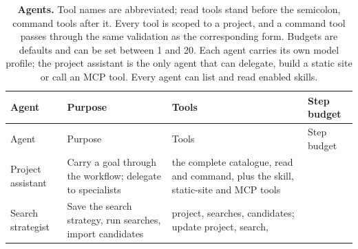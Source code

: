 \documentclass[11pt,a4paper]{article}
\begin{document}
\begin{longtable}[]{@{}
  >{\raggedright\arraybackslash}p{}
  >{\raggedright\arraybackslash}p{}
  >{\raggedright\arraybackslash}p{}
  >{\raggedright\arraybackslash}p{}@{}}
\caption{\label{tab:agents}\textbf{Agents.} Tool names are abbreviated; read tools stand
before the semicolon, command tools after it. Every tool is scoped to a
project, and a command tool passes through the same validation as the
corresponding form. Budgets are defaults and can be set between 1 and
20. Each agent carries its own model profile; the project assistant is
the only agent that can delegate, build a static site or call an MCP
tool. Every agent can list and read enabled skills.}\tabularnewline
\toprule\noalign{}
\begin{minipage}[b]{\linewidth}\raggedright
Agent
\end{minipage} & \begin{minipage}[b]{\linewidth}\raggedright
Purpose
\end{minipage} & \begin{minipage}[b]{\linewidth}\raggedright
Tools
\end{minipage} & \begin{minipage}[b]{\linewidth}\raggedright
Step budget
\end{minipage} \\
\midrule\noalign{}
\endfirsthead
\toprule\noalign{}
\begin{minipage}[b]{\linewidth}\raggedright
Agent
\end{minipage} & \begin{minipage}[b]{\linewidth}\raggedright
Purpose
\end{minipage} & \begin{minipage}[b]{\linewidth}\raggedright
Tools
\end{minipage} & \begin{minipage}[b]{\linewidth}\raggedright
Step budget
\end{minipage} \\
\midrule\noalign{}
\endhead
\bottomrule\noalign{}
\endlastfoot
Project assistant & Carry a goal through the workflow; delegate to
specialists & the complete catalogue, read and command, plus the skill,
static-site and MCP tools & 20 \\
Search strategist & Save the search strategy, run searches, import
candidates & project, searches, candidates; update project, search,

\end{longtable}
\end{document}

